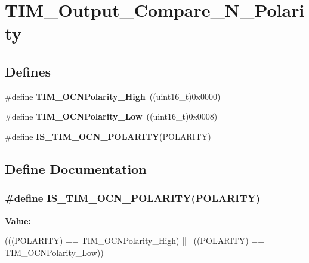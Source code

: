 \hypertarget{group__TIM__Output__Compare__N__Polarity}{
\section{TIM\_\-Output\_\-Compare\_\-N\_\-Polarity}
\label{group__TIM__Output__Compare__N__Polarity}
}
\subsection*{Defines}
\begin{DoxyCompactItemize}
\item 
\hypertarget{group__TIM__Output__Compare__N__Polarity_gaa62288888d4f6858bee6b3cd9086ae3f}{
\#define {\bfseries TIM\_\-OCNPolarity\_\-High}~((uint16\_\-t)0x0000)}
\label{group__TIM__Output__Compare__N__Polarity_gaa62288888d4f6858bee6b3cd9086ae3f}

\item 
\hypertarget{group__TIM__Output__Compare__N__Polarity_ga9582560b2e7dae2e8dc3b65909b0c9cf}{
\#define {\bfseries TIM\_\-OCNPolarity\_\-Low}~((uint16\_\-t)0x0008)}
\label{group__TIM__Output__Compare__N__Polarity_ga9582560b2e7dae2e8dc3b65909b0c9cf}

\item 
\#define {\bfseries IS\_\-TIM\_\-OCN\_\-POLARITY}(POLARITY)
\end{DoxyCompactItemize}


\subsection{Define Documentation}
\hypertarget{group__TIM__Output__Compare__N__Polarity_gad7385dee1d2b6ce0daf23ceaac4439cd}{
\subsubsection[{IS\_\-TIM\_\-OCN\_\-POLARITY}]{\setlength{\rightskip}{0pt plus 5cm}\#define IS\_\-TIM\_\-OCN\_\-POLARITY(POLARITY)}}
\label{group__TIM__Output__Compare__N__Polarity_gad7385dee1d2b6ce0daf23ceaac4439cd}
{\bfseries Value:}
\begin{DoxyCode}
(((POLARITY) == TIM_OCNPolarity_High) || \
                                       ((POLARITY) == TIM_OCNPolarity_Low))
\end{DoxyCode}
